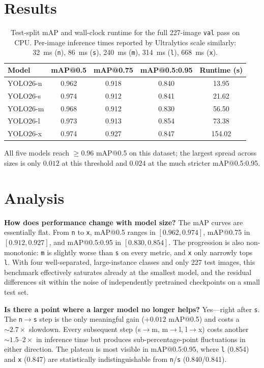 \documentclass[11pt,a4paper]{article}
\begin{document}
\section*{Results}
\begin{table}[H]
    \centering
    \begin{tabular}{lcccc}
        \toprule
        Model & mAP@0.5 & mAP@0.75 & mAP@0.5:0.95 & Runtime (s) \\
        \midrule
        YOLO26-n & 0.962 & 0.918 & 0.840 & 13.95 \\
        YOLO26-s & 0.974 & 0.912 & 0.841 & 21.62 \\
        YOLO26-m & 0.968 & 0.912 & 0.830 & 56.50 \\
        YOLO26-l & 0.973 & 0.913 & 0.854 & 73.38 \\
        YOLO26-x & 0.974 & 0.927 & 0.847 & 154.02 \\
        \bottomrule
    \end{tabular}
    \caption{Test-split mAP and wall-clock runtime for the full 227-image \texttt{val} pass on CPU. Per-image inference times reported by Ultralytics scale similarly: 32~ms (\texttt{n}), 86~ms (\texttt{s}), 240~ms (\texttt{m}), 314~ms (\texttt{l}), 668~ms (\texttt{x}).}
    \label{tab:metrics}
\end{table}

All five models reach $\geq 0.96$ mAP@0.5 on this dataset; the largest spread across sizes is only $0.012$ at this threshold and $0.024$ at the much stricter mAP@0.5:0.95.

\section*{Analysis}
\textbf{How does performance change with model size?}
The mAP curves are essentially flat. From \texttt{n} to \texttt{x}, mAP@0.5 ranges in $[0.962, 0.974]$, mAP@0.75 in $[0.912, 0.927]$, and mAP@0.5:0.95 in $[0.830, 0.854]$. The progression is also non-monotonic: \texttt{m} is slightly worse than \texttt{s} on every metric, and \texttt{x} only narrowly tops \texttt{l}. With four well-separated, large-instance classes and only 227 test images, this benchmark effectively saturates already at the smallest model, and the residual differences sit within the noise of independently pretrained checkpoints on a small test set.

\textbf{Is there a point where a larger model no longer helps?}
Yes---right after \texttt{s}. The \texttt{n}$\rightarrow$\texttt{s} step is the only meaningful gain ($+0.012$ mAP@0.5) and costs a $\sim2.7\times$ slowdown. Every subsequent step (s$\rightarrow$m, m$\rightarrow$l, l$\rightarrow$x) costs another $\sim1.5$--$2\times$ in inference time but produces sub-percentage-point fluctuations in either direction. The plateau is most visible in mAP@0.5:0.95, where \texttt{l} (0.854) and \texttt{x} (0.847) are statistically indistinguishable from \texttt{n}/\texttt{s} (0.840/0.841).
\end{document}

